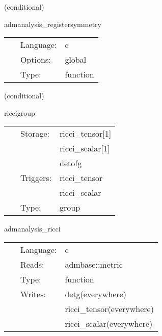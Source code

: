 \vspace{5mm}

   (conditional) 

\hspace{5mm} admanalysis\_registersymmetry 

\hspace{5mm}{\it register symmetry of ricci tensor and scalar } 


\hspace{5mm}

 \begin{tabular*}{160mm}{cll} 
~ & Language:  & c \\ 
~ & Options:  & global \\ 
~ & Type:  & function \\ 
\end{tabular*} 


\vspace{5mm}

   (conditional) 

\hspace{5mm} riccigroup 

\hspace{5mm}{\it calculate ricci tensor, with boundary conditions } 


\hspace{5mm}

 \begin{tabular*}{160mm}{cll} 
~ & Storage:  & ricci\_tensor[1] \\ 
~& ~ &ricci\_scalar[1]\\ 
~& ~ &detofg\\ 
~ & Triggers:  & ricci\_tensor \\ 
~& ~ &ricci\_scalar\\ 
~ & Type:  & group \\ 
\end{tabular*} 


\vspace{5mm}


\hspace{5mm} admanalysis\_ricci 

\hspace{5mm}{\it calculate ricci tensor, with boundary conditions } 


\hspace{5mm}

 \begin{tabular*}{160mm}{cll} 
~ & Language:  & c \\ 
~ & Reads:  & admbase::metric \\ 
~ & Type:  & function \\ 
~ & Writes:  & detg(everywhere) \\ 
~& ~ &ricci\_tensor(everywhere)\\ 
~& ~ &ricci\_scalar(everywhere)\\ 
\end{tabular*} 


